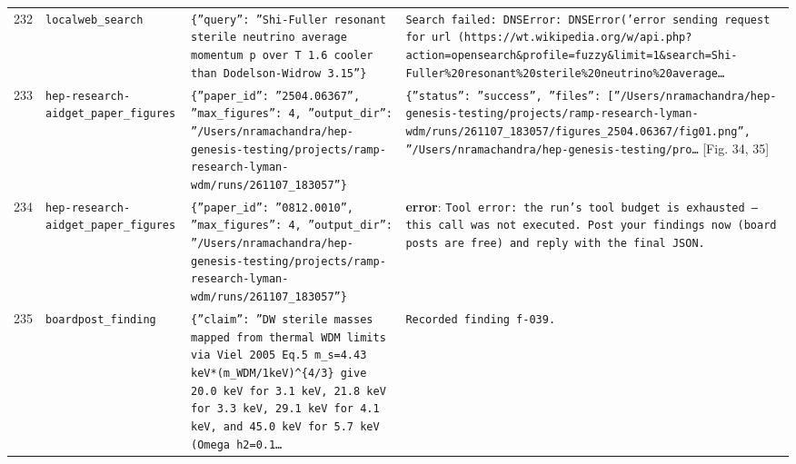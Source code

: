 \documentclass[11pt,a4paper]{article}
\begin{document}
\begin{longtable}{@{}p{}p{}p{}p{}@{}}
232 & \texttt{local}\newline\texttt{web\_\allowbreak{}search} & \texttt{\{''query'':\allowbreak{} ''Shi-Fuller resonant sterile neutrino average momentum p over T 1.6 cooler than Dodelson-Widrow 3.15''\}\allowbreak{}} & \texttt{Search failed:\allowbreak{} DNSError:\allowbreak{} DNSError('error sending request for url (https:\allowbreak{}/\allowbreak{}/\allowbreak{}wt.wikipedia.org/\allowbreak{}w/\allowbreak{}api.php?action=\allowbreak{}opensearch\&profile=\allowbreak{}fuzzy\&limit=\allowbreak{}1\&search=\allowbreak{}Shi-Fuller\%20resonant\%20sterile\%20neutrino\%20average\ldots{}\allowbreak{}} \\
233 & \texttt{hep-research-aid}\newline\texttt{get\_\allowbreak{}paper\_\allowbreak{}figures} & \texttt{\{''paper\_\allowbreak{}id'':\allowbreak{} ''2504.06367'',\allowbreak{} ''max\_\allowbreak{}figures'':\allowbreak{} 4,\allowbreak{} ''output\_\allowbreak{}dir'':\allowbreak{} ''/\allowbreak{}Users/\allowbreak{}nramachandra/\allowbreak{}hep-genesis-testing/\allowbreak{}projects/\allowbreak{}ramp-research-lyman-wdm/\allowbreak{}runs/\allowbreak{}261107\_\allowbreak{}183057''\}\allowbreak{}} & \texttt{\{''status'':\allowbreak{} ''success'',\allowbreak{} ''files'':\allowbreak{} [''/\allowbreak{}Users/\allowbreak{}nramachandra/\allowbreak{}hep-genesis-testing/\allowbreak{}projects/\allowbreak{}ramp-research-lyman-wdm/\allowbreak{}runs/\allowbreak{}261107\_\allowbreak{}183057/\allowbreak{}figures\_\allowbreak{}2504.06367/\allowbreak{}fig01.png'',\allowbreak{} ''/\allowbreak{}Users/\allowbreak{}nramachandra/\allowbreak{}hep-genesis-testing/\allowbreak{}pro\ldots{}\allowbreak{}} [Fig. 34, 35] \\
234 & \texttt{hep-research-aid}\newline\texttt{get\_\allowbreak{}paper\_\allowbreak{}figures} & \texttt{\{''paper\_\allowbreak{}id'':\allowbreak{} ''0812.0010'',\allowbreak{} ''max\_\allowbreak{}figures'':\allowbreak{} 4,\allowbreak{} ''output\_\allowbreak{}dir'':\allowbreak{} ''/\allowbreak{}Users/\allowbreak{}nramachandra/\allowbreak{}hep-genesis-testing/\allowbreak{}projects/\allowbreak{}ramp-research-lyman-wdm/\allowbreak{}runs/\allowbreak{}261107\_\allowbreak{}183057''\}\allowbreak{}} & \textbf{error}: \texttt{Tool error:\allowbreak{} the run's tool budget is exhausted --- this call was not executed. Post your findings now (board posts are free)\allowbreak{} and reply with the final JSON.} \\
235 & \texttt{board}\newline\texttt{post\_\allowbreak{}finding} & \texttt{\{''claim'':\allowbreak{} ''DW sterile masses mapped from thermal WDM limits via Viel 2005 Eq.5 m\_\allowbreak{}s=\allowbreak{}4.43 keV*(m\_\allowbreak{}WDM/\allowbreak{}1keV)\allowbreak{}\textasciicircum{}\allowbreak{}\{4/\allowbreak{}3\}\allowbreak{} give 20.0 keV for 3.1 keV,\allowbreak{} 21.8 keV for 3.3 keV,\allowbreak{} 29.1 keV for 4.1 keV,\allowbreak{} and 45.0 keV for 5.7 keV (Omega h2=\allowbreak{}0.1\ldots{}\allowbreak{}} & \texttt{Recorded finding f-039.} \\

\end{longtable}
\end{document}
